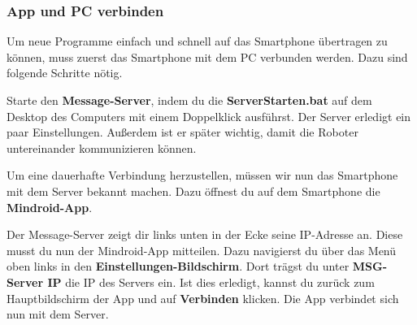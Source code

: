 \documentclass[
	12pt,
	article,
	type=bsc, %
	colorbacktitle,
	instlogo,
	accentcolor=tud1c,
	german,
	twoside
]{tudexercise}
\begin{document}
	\subsubsection{App und PC verbinden}
	Um neue Programme einfach und schnell auf das Smartphone übertragen zu können, muss zuerst das Smartphone mit dem PC verbunden werden. Dazu sind folgende Schritte nötig.
	\begin{enumerate}
	\begin{minipage}{.5\textwidth}
	
	\item Starte den \textbf{Message-Server}, indem du die \textbf{ServerStarten.bat} auf dem Desktop des Computers mit einem Doppelklick ausführst. Der Server erledigt ein paar Einstellungen. Außerdem ist er später wichtig, damit die Roboter untereinander kommunizieren können.
	 
	\item Um eine dauerhafte Verbindung herzustellen, müssen wir nun das Smartphone mit dem Server bekannt machen. Dazu öffnest du auf dem Smartphone die \textbf{Mindroid-App}. 
	
	\item Der Message-Server zeigt dir links unten in der Ecke seine IP-Adresse an. Diese musst du nun der Mindroid-App mitteilen. Dazu navigierst du über das Menü oben links in den \textbf{Einstellungen-Bildschirm}. Dort trägst du unter \textbf{MSG-Server IP} die IP des Servers ein. Ist dies erledigt, kannst du zurück zum Hauptbildschirm der App und auf \textbf{Verbinden} klicken. Die App verbindet sich nun mit dem Server.
	
	\end{minipage}	
	\begin{minipage}{.5\textwidth}
	

\end{minipage}
\end{enumerate}
\end{document}
